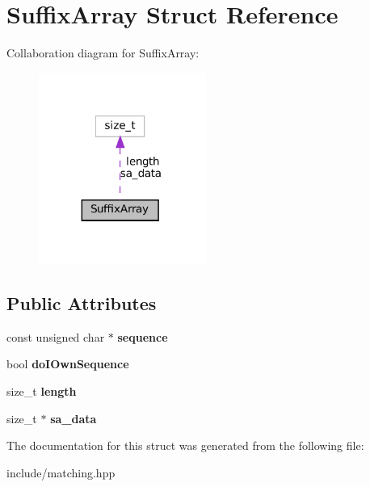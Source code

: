 \hypertarget{structSuffixArray}{}\section{Suffix\+Array Struct Reference}
\label{structSuffixArray}


Collaboration diagram for Suffix\+Array\+:\nopagebreak
\begin{figure}[H]
\begin{center}
\leavevmode
\includegraphics[width=155pt]{structSuffixArray__coll__graph}
\end{center}
\end{figure}
\subsection*{Public Attributes}
\begin{DoxyCompactItemize}
\item 
\mbox{\label{structSuffixArray_aadf3610482051435eab01c4d41c139d9}} 
const unsigned char $\ast$ {\bfseries sequence}
\item 
\mbox{\label{structSuffixArray_ad11e732cc403a4ffe3ee304f9c0276b0}} 
bool {\bfseries do\+I\+Own\+Sequence}
\item 
\mbox{\label{structSuffixArray_a3d1083953dbad8d1dcfc789c29c9dfd4}} 
size\+\_\+t {\bfseries length}
\item 
\mbox{\label{structSuffixArray_a97244e7297dcf96af1101094fae198c0}} 
size\+\_\+t $\ast$ {\bfseries sa\+\_\+data}
\end{DoxyCompactItemize}


The documentation for this struct was generated from the following file\+:\begin{DoxyCompactItemize}
\item 
include/matching.\+hpp\end{DoxyCompactItemize}
